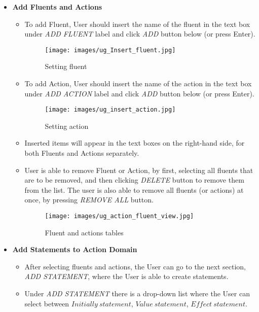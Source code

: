 \documentclass[a4paper]{article}
\begin{document}
\begin{itemize}
    \item \textbf{Add Fluents and Actions}
        \begin{itemize}
        \item[] To add Fluent, User should insert the name of the fluent in the text box under \textit{ADD FLUENT} label and click \textit{ADD} button below (or press Enter).
        \begin{figure}[H]
            \centering
            \texttt{[image: images/ug\_Insert\_fluent.jpg]}
            \caption{Setting fluent}
            \label{fig:cm-rho-001}
        \end{figure}
        \item[] To add Action, User should insert the name of the action in the text box under \textit{ADD ACTION} label and click \textit{ADD} button below (or press Enter).
        \begin{figure}[H]
            \centering
            \texttt{[image: images/ug\_insert\_action.jpg]}
            \caption{Setting action}
            \label{fig:cm-rho-001}
        \end{figure}
        \item[] Inserted items will appear in the text boxes on the right-hand side, for both Fluents and Actions separately.
        \item[] User is able to remove Fluent or Action, by first, selecting all fluents that are to be removed, and then clicking \textit{DELETE} button to remove them from the list. The user is also able to remove all fluents (or actions) at once, by pressing \textit{REMOVE ALL} button.
        \begin{figure}[H]
            \centering
            \texttt{[image: images/ug\_action\_fluent\_view.jpg]}
            \caption{Fluent and actions tables}
            \label{fig:cm-rho-001}
        \end{figure}
        \end{itemize}
    \item \textbf{Add Statements to Action Domain}
        \begin{itemize}
        \item[] After selecting fluents and actions, the User can go to the next section, \textit{ADD STATEMENT}, where the User is able to create statements.
        \item[] Under \textit{ADD STATEMENT} there is a drop-down list where the User can select between $Initially~statement$, $Value~statement$, $Effect~statement$.

\end{itemize}
\end{itemize}
\end{document}
